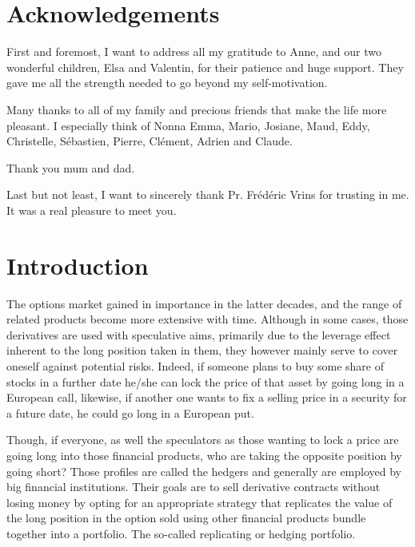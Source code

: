 \documentclass[12pt,a4paper]{report}
\begin{document}
\chapter*{Acknowledgements}

First and foremost, I want to address all my gratitude to Anne, and our two wonderful children, Elsa and Valentin, for their patience and huge support. They gave me all the strength needed to go beyond my self-motivation.

Many thanks to all of my family and precious friends that make the life more pleasant. I especially think of Nonna Emma, Mario, Josiane, Maud, Eddy, Christelle, Sébastien, Pierre, Clément, Adrien and Claude.

Thank you mum and dad.

Last but not least, I want to sincerely thank Pr. Frédéric Vrins for trusting in me. It was a real pleasure to meet you.




{
\tableofcontents
\clearpage

\listoffigures
 \clearpage


\listoftables}
\clearpage



%
%
\chapter{Introduction}
\label{cha:Introduction}

The options market gained in importance in the latter decades, and the range of related products become more extensive with time.
Although in some cases, those derivatives are used with speculative aims, primarily due to the leverage effect inherent to the long position taken in them, they however mainly serve to cover oneself against potential risks.
Indeed, if someone plans to buy some share of stocks in a further date he/she can lock the price of that asset by going long in a European call, likewise, if another one wants to fix a selling price in a security for a future date, he could go long in a European put.

Though, if everyone, as well the speculators as those wanting to lock a price are going long into those financial products, who are taking the opposite position by going short?
Those profiles are called the hedgers and generally are employed by big financial institutions.
Their goals are to sell derivative contracts without losing money by opting for an appropriate strategy that replicates the value of the long position in the option sold using other financial products bundle together into a portfolio. The so-called replicating or hedging portfolio.
\end{document}
